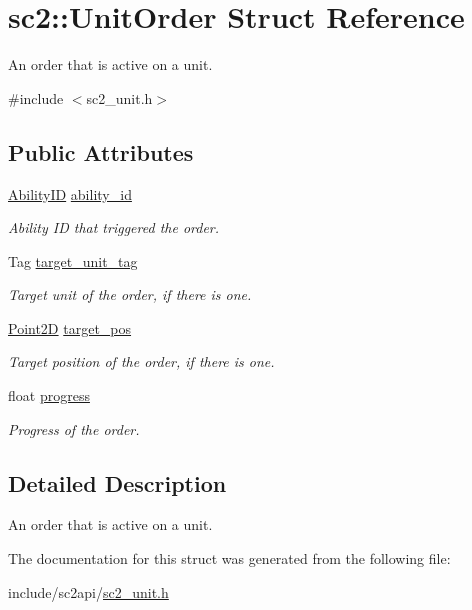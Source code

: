\hypertarget{structsc2_1_1_unit_order}{}\section{sc2\+:\+:Unit\+Order Struct Reference}
\label{structsc2_1_1_unit_order}


An order that is active on a unit.  




{\ttfamily \#include $<$sc2\+\_\+unit.\+h$>$}

\subsection*{Public Attributes}
\begin{DoxyCompactItemize}
\item 
\mbox{\label{structsc2_1_1_unit_order_a0582df20b81543fd031972a497920d74}} 
\hyperlink{classsc2_1_1_s_c2_type}{Ability\+ID} \hyperlink{structsc2_1_1_unit_order_a0582df20b81543fd031972a497920d74}{ability\+\_\+id}
\begin{DoxyCompactList}\small\item\em Ability ID that triggered the order. \end{DoxyCompactList}\item 
\mbox{\label{structsc2_1_1_unit_order_aefffc0324bbb24f7dd7ab8def4e5afc2}} 
Tag \hyperlink{structsc2_1_1_unit_order_aefffc0324bbb24f7dd7ab8def4e5afc2}{target\+\_\+unit\+\_\+tag}
\begin{DoxyCompactList}\small\item\em Target unit of the order, if there is one. \end{DoxyCompactList}\item 
\mbox{\label{structsc2_1_1_unit_order_ae4c062864ad55c38faaf1e1abcb74671}} 
\hyperlink{structsc2_1_1_point2_d}{Point2D} \hyperlink{structsc2_1_1_unit_order_ae4c062864ad55c38faaf1e1abcb74671}{target\+\_\+pos}
\begin{DoxyCompactList}\small\item\em Target position of the order, if there is one. \end{DoxyCompactList}\item 
\mbox{\label{structsc2_1_1_unit_order_a820bb8f79dcaebcd02475b5ac2c522cc}} 
float \hyperlink{structsc2_1_1_unit_order_a820bb8f79dcaebcd02475b5ac2c522cc}{progress}
\begin{DoxyCompactList}\small\item\em Progress of the order. \end{DoxyCompactList}\end{DoxyCompactItemize}


\subsection{Detailed Description}
An order that is active on a unit. 

The documentation for this struct was generated from the following file\+:\begin{DoxyCompactItemize}
\item 
include/sc2api/\hyperlink{sc2__unit_8h}{sc2\+\_\+unit.\+h}\end{DoxyCompactItemize}
